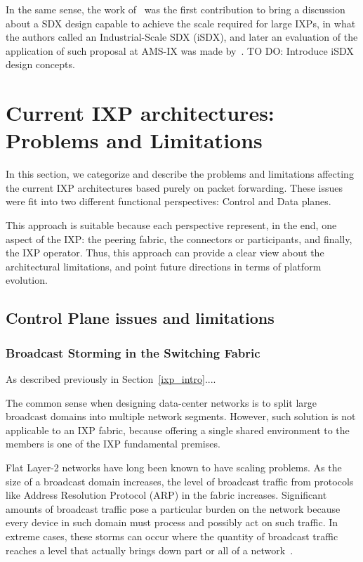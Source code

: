 \documentclass[conference]{IEEEtran/IEEEtran}
\begin{document}
In the same sense, the work of~\cite{gupta2016industrial} was the first contribution to bring a discussion about a SDX design capable to achieve the scale required for large IXPs, in what the authors called an Industrial-Scale SDX (iSDX), and later an evaluation of the application of such proposal at AMS-IX was made by~\cite{hermansfeasibility}.
TO DO: Introduce iSDX design concepts.

\section{Current IXP architectures: Problems and Limitations}
\label{current_ixp}
In this section, we categorize and describe the problems and limitations affecting the current IXP architectures based purely on packet forwarding. These issues were fit into two different functional perspectives: Control and Data planes. 

This approach is suitable because each perspective represent, in the end, one aspect of the IXP: the peering fabric, the connectors or participants, and finally, the IXP operator. Thus, this approach can provide a clear view about the architectural limitations, and point future directions in terms of platform evolution. 

\subsection{Control Plane issues and limitations}
\label{subsec:issues_cp}

\subsubsection{Broadcast Storming in the Switching Fabric}
\label{subsubsec:broadcast_storm}
As described previously in Section~\ref{ixp_intro}....



The common sense when designing data-center networks is to split large broadcast domains into multiple network segments. However, such solution is not applicable to an IXP fabric, because offering a single shared environment to the members is one of the IXP fundamental premises. 

Flat Layer-2 networks have long been known to have scaling problems. As the size of a broadcast domain increases, the level of broadcast traffic from protocols like Address Resolution Protocol (ARP) in the fabric increases. Significant amounts of broadcast traffic pose a particular burden on the network because every device in such domain must process and possibly act on such traffic. In extreme cases, these storms can occur where the quantity of broadcast traffic reaches a level that actually brings down part or all of a network~\cite{rfc6820}. 
\end{document}
